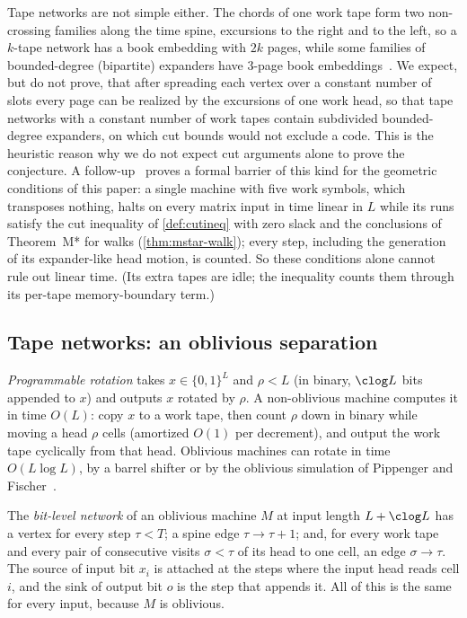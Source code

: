 Tape networks are not simple either. The chords of one work tape form two non-crossing families along the
time spine, excursions to the right and to the left, so a $k$-tape network has a book embedding with $2k$ pages,
while some families of bounded-degree (bipartite) expanders have $3$-page book embeddings~\cite{DSW2016}. We expect, but do not prove, that after
spreading each vertex over a constant number of slots every page can be realized by the excursions of one work head,
so that tape networks with a constant number of work tapes contain subdivided bounded-degree expanders, on which cut
bounds would not exclude a code. This is the heuristic reason why we do not expect cut arguments alone to prove the conjecture. A follow-up~\cite{BrendeAstra2026} proves a formal barrier of this kind for the geometric conditions of this paper: a single machine with five work symbols, which transposes nothing, halts on every matrix input in time linear in $L$ while its runs satisfy the cut inequality of \cref{def:cutineq} with zero slack and the conclusions of Theorem~M* for walks (\cref{thm:mstar-walk}); every step, including the generation of its expander-like head motion, is counted. So these conditions alone cannot rule out linear time. (Its extra tapes are idle; the inequality counts them through its per-tape memory-boundary term.)

\subsection{Tape networks: an oblivious separation}

\emph{Programmable rotation} takes $x\in\{0,1\}^L$ and $\rho<L$ (in binary, $\clog L$ bits appended to $x$)
and outputs $x$ rotated by $\rho$. A non-oblivious machine computes it in time $O(L)$: copy $x$ to a work tape,
then count $\rho$ down in binary while moving a head $\rho$ cells (amortized $O(1)$ per decrement), and output the
work tape cyclically from that head. Oblivious machines can rotate in time $O(L\log L)$, by a barrel shifter or
by the oblivious simulation of Pippenger and Fischer~\cite{PippengerFischer1979}.

The \emph{bit-level network} of an oblivious machine $M$ at input length $L+\clog L$ has a vertex for every
step $\tau<T$; a spine edge $\tau\to\tau+1$; and, for every work tape and every pair of consecutive visits
$\sigma<\tau$ of its head to one cell, an edge $\sigma\to\tau$. The source of input bit $x_i$ is attached
at the steps where the input head reads cell $i$, and the sink of output bit $o$ is the step that appends
it. All of this is the same for every input, because $M$ is oblivious.


